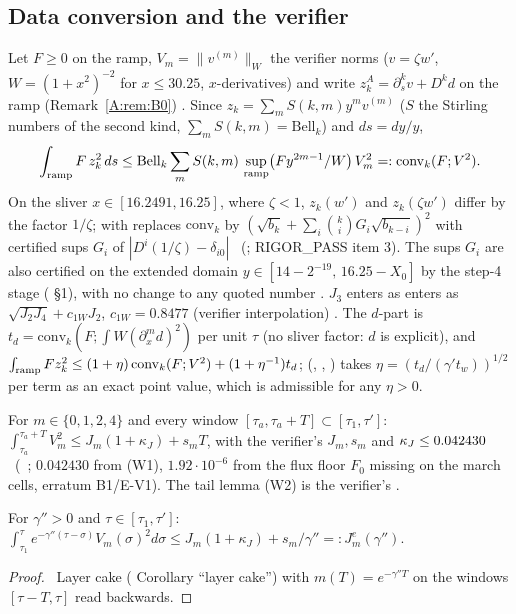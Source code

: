 \documentclass[11pt]{article}
\begin{document}
\subsection{Data conversion and the verifier}
\begin{lemma}\label{A:lem:conv}
Let $F\ge0$ on the ramp, $V_m=\|v^{(m)}\|_W$ the verifier norms ($v=\zeta w'$, $W=(1+x^2)^{-2}$ for $x\le30.25$, $x$-derivatives) and write $z^A_k=\partial_s^kv+D^kd$ on the ramp (Remark~\ref{A:rem:B0}) \tB. Since $z_k=\sum_mS(k,m)y^mv^{(m)}$ ($S$ the Stirling numbers of the second kind, $\sum_mS(k,m)=\mathrm{Bell}_k$) and $ds=dy/y$,
\[
\int_{\rm ramp}F\,z_k^2\,ds\le\mathrm{Bell}_k\sum_mS(k,m)\,\sup_{\rm ramp}\bigl(Fy^{2m-1}/W\bigr)\,V_m^2=:\mathrm{conv}_k(F;V^2).
\]
On the sliver $x\in[16.2491,16.25]$, where $\zeta<1$, $z_k(w')$ and $z_k(\zeta w')$ differ by the factor $1/\zeta$;  with  replaces $\mathrm{conv}_k$ by $(\sqrt{b_k}+\sum_i\binom kiG_i\sqrt{b_{k-i}})^2$ with certified sups $G_i$ of $|D^i(1/\zeta)-\delta_{i0}|$ \tC\ (; RIGOR\_PASS item 3). The sups $G_i$ are also certified on the extended domain $y\in[14-2^{-19},\,16.25-X_0]$ by the step-4 stage  ( \S1), with no change to any quoted number \tC. $J_3$ enters as enters as $\sqrt{J_2J_4}+c_{1W}J_2$, $c_{1W}=0.8477$ (verifier interpolation) \tH. The $d$-part is $t_d=\mathrm{conv}_k(F;\int W(\partial_x^md)^2)$ per unit $\tau$ (no sliver factor: $d$ is explicit), and $\int_{\rm ramp}Fz_k^2\le(1+\eta)\,\mathrm{conv}_k(F;V^2)+(1+\eta^{-1})t_d$;  (, , ) takes $\eta=(t_d/(\gamma't_w))^{1/2}$ per term as an exact point value, which is admissible for any $\eta>0$.
\end{lemma}
\begin{lemma}\label{A:lem:HJ}
For $m\in\{0,1,2,4\}$ and every window $[\tau_a,\tau_a+T]\subset[\tau_1,\tau']$: $\int_{\tau_a}^{\tau_a+T}V_m^2\le J_m(1+\kappa_J)+s_mT$, with the verifier's $J_m,s_m$ and $\kappa_J\le0.042430$ \tC\ (\SA\ ; $0.042430$ from (W1), $1.92\cdot10^{-6}$ from the flux floor $F_0$ missing on the march cells, erratum B1/E-V1). The tail lemma (W2) is the verifier's \tH.
\end{lemma}
\begin{corollary}\label{A:cor:exp}
For $\gamma''>0$ and $\tau\in[\tau_1,\tau']$: $\int_{\tau_1}^{\tau}e^{-\gamma''(\tau-\sigma)}V_m(\sigma)^2d\sigma\le J_m(1+\kappa_J)+s_m/\gamma''=:J^{e}_m(\gamma'')$.
\end{corollary}
\begin{proof}\tP\ Layer cake ( Corollary ``layer cake'') with $m(T)=e^{-\gamma''T}$ on the windows $[\tau-T,\tau]$ read backwards.
\end{proof}
\end{document}
